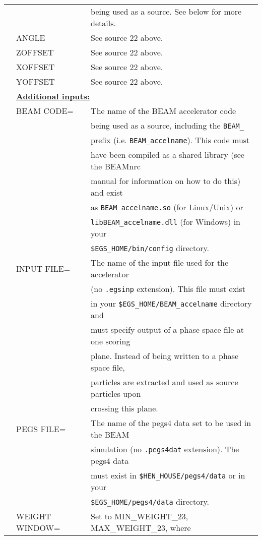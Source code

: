\begin{longtable}{lll}
  &      & being used as a source.  See below for more details.\\
  & ANGLE & See source 22 above.\\
  & ZOFFSET & See source 22 above.\\
  & XOFFSET & See source 22 above.\\
  & YOFFSET & See source 22 above.\\
& \multicolumn{2}{l}{\bf \underline {Additional inputs:}}\\
  & BEAM CODE= & The name of the BEAM accelerator code\\
  &            & being used as a source, including the {\tt BEAM\_}\\
  &            & prefix (i.e. {\tt BEAM\_accelname}).  This code must\\
  &            & have been compiled as a shared library (see the BEAMnrc\\
  &            & manual for information on how to do this) and exist\\
  &            & as {\tt BEAM\_accelname.so} (for Linux/Unix) or\\
  &            & {\tt libBEAM\_accelname.dll} (for Windows) in your\\
  &            & {\tt \$EGS\_HOME/bin/config} directory.\\
  & INPUT FILE= & The name of the input file used for the accelerator\\
  &             & (no {\tt .egsinp} extension).  This file must exist\\
  &             & in your {\tt \$EGS\_HOME/BEAM\_accelname} directory and\\
  &             & must specify output of a phase space file at one scoring\\
  &             & plane.  Instead of being written to a phase space file,\\
  &             & particles are extracted and used as source particles upon\\
  &             & crossing this plane.\\
  & PEGS FILE= & The name of the pegs4 data set to be used in the BEAM\\
  &            & simulation (no {\tt .pegs4dat} extension).  The pegs4 data\\
  &            & must exist in {\tt \$HEN\_HOUSE/pegs4/data} or in your\\
  &            & {\tt \$EGS\_HOME/pegs4/data} directory.\\
  & WEIGHT WINDOW= & Set to MIN\_WEIGHT\_23, MAX\_WEIGHT\_23, where\\

\end{longtable}
